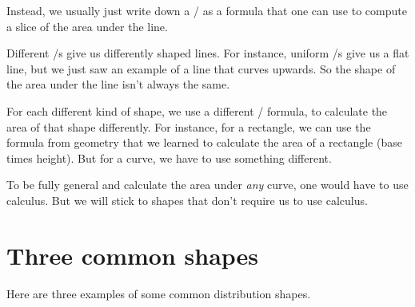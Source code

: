 \documentclass[../../../main.tex]{subfiles}
\begin{document}
Instead, we usually just write down a \CDFtext/ as a formula that one can use to compute a slice of the area under the line. 

Different \PDFtext/s give us differently shaped lines. For instance, uniform \PDFtext/s give us a flat line, but we just saw an example of a line that curves upwards. So the shape of the area under the line isn't always the same.

For each different kind of shape, we use a different \CDFtext/ formula, to calculate the area of that shape differently. For instance, for a rectangle, we can use the formula from geometry that we learned to calculate the area of a rectangle (base times height). But for a curve, we have to use something different.

To be fully general and calculate the area under \emph{any} curve, one would have to use calculus. But we will stick to shapes that don't require us to use calculus.


\section{Three common shapes}

Here are three examples of some common distribution shapes.
\end{document}
